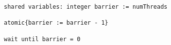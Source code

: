 \begin{lstlisting}[mathescape]
shared variables: integer barrier := numThreads

atomic{barrier := barrier - 1}

wait until barrier = 0
\end{lstlisting}
